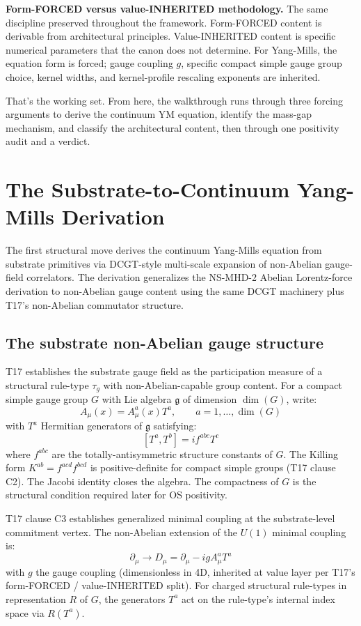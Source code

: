 \documentclass[11pt,a4paper]{article}
\begin{document}
\textbf{Form-FORCED versus value-INHERITED methodology.} The same discipline preserved throughout the framework. Form-FORCED content is derivable from architectural principles. Value-INHERITED content is specific numerical parameters that the canon does not determine. For Yang-Mills, the equation form is forced; gauge coupling $g$, specific compact simple gauge group choice, kernel widths, and kernel-profile rescaling exponents are inherited.

That's the working set. From here, the walkthrough runs through three forcing arguments to derive the continuum YM equation, identify the mass-gap mechanism, and classify the architectural content, then through one positivity audit and a verdict.

\section{The Substrate-to-Continuum Yang-Mills Derivation}

The first structural move derives the continuum Yang-Mills equation from substrate primitives via DCGT-style multi-scale expansion of non-Abelian gauge-field correlators. The derivation generalizes the NS-MHD-2 Abelian Lorentz-force derivation to non-Abelian gauge content using the same DCGT machinery plus T17's non-Abelian commutator structure.

\subsection{The substrate non-Abelian gauge structure}

T17 establishes the substrate gauge field as the participation measure of a structural rule-type $\tau_g$ with non-Abelian-capable group content. For a compact simple gauge group $G$ with Lie algebra $\mathfrak{g}$ of dimension $\dim(G)$, write:
\[
A_\mu(x) = A_\mu^a(x) T^a, \qquad a = 1, \ldots, \dim(G)
\]
with $T^a$ Hermitian generators of $\mathfrak{g}$ satisfying:
\[
[T^a, T^b] = i f^{abc} T^c
\]
where $f^{abc}$ are the totally-antisymmetric structure constants of $G$. The Killing form $K^{ab} = f^{acd} f^{bcd}$ is positive-definite for compact simple groups (T17 clause C2). The Jacobi identity closes the algebra. The compactness of $G$ is the structural condition required later for OS positivity.

T17 clause C3 establishes generalized minimal coupling at the substrate-level commitment vertex. The non-Abelian extension of the $U(1)$ minimal coupling is:
\[
\partial_\mu \to D_\mu = \partial_\mu - ig A_\mu^a T^a
\]
with $g$ the gauge coupling (dimensionless in 4D, inherited at value layer per T17's form-FORCED / value-INHERITED split). For charged structural rule-types in representation $R$ of $G$, the generators $T^a$ act on the rule-type's internal index space via $R(T^a)$.
\end{document}
